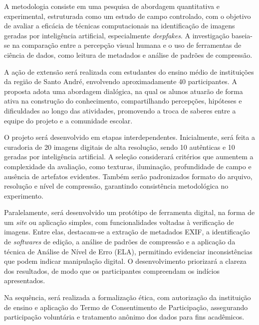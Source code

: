 A metodologia consiste em uma pesquisa de abordagem quantitativa e experimental,
estruturada como um estudo de campo controlado, com o objetivo de avaliar a
eficácia de técnicas computacionais na identificação de imagens geradas por
inteligência artificial, especialmente \textit{deepfakes}. A investigação
baseia-se na comparação entre a percepção visual humana e o uso de ferramentas de
ciência de dados, como leitura de metadados e análise de padrões de compressão.

A ação de extensão será realizada com estudantes do ensino médio de instituições
da região de Santo André, envolvendo aproximadamente 40 participantes. A proposta
adota uma abordagem dialógica, na qual os alunos atuarão de forma ativa na
construção do conhecimento, compartilhando percepções, hipóteses e dificuldades
ao longo das atividades, promovendo a troca de saberes entre a equipe do projeto
e a comunidade escolar.

O projeto será desenvolvido em etapas interdependentes. Inicialmente, será feita a
curadoria de 20 imagens digitais de alta resolução, sendo 10 autênticas e 10
geradas por inteligência artificial. A seleção considerará critérios que aumentem
a complexidade da avaliação, como texturas, iluminação, profundidade de campo e
ausência de artefatos evidentes. Também serão padronizados formato do arquivo,
resolução e nível de compressão, garantindo consistência metodológica no
experimento.

Paralelamente, será desenvolvido um protótipo de ferramenta digital, na forma de
um \textit{site} ou aplicação simples, com funcionalidades voltadas à verificação
de imagens. Entre elas, destacam-se a extração de metadados EXIF, a identificação
de \textit{softwares} de edição, a análise de padrões de compressão e a aplicação
da técnica de Análise de Nível de Erro (ELA), permitindo evidenciar
inconsistências que podem indicar manipulação digital. O desenvolvimento
priorizará a clareza dos resultados, de modo que os participantes compreendam os
indícios apresentados.

Na sequência, será realizada a formalização ética, com autorização da instituição
de ensino e aplicação do Termo de Consentimento de Participação, assegurando
participação voluntária e tratamento anônimo dos dados para fins acadêmicos.

